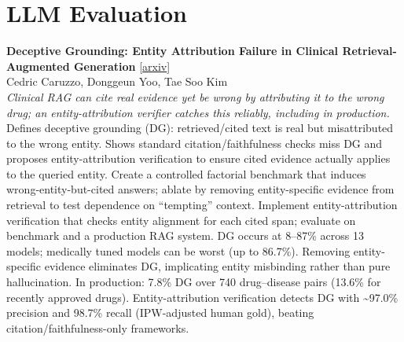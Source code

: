 \documentclass[12pt,letterpaper]{article}
\begin{document}
\medskip


\section*{LLM Evaluation}

{\small\textbf{Deceptive Grounding: Entity Attribution Failure in Clinical Retrieval-Augmented Generation}} {\scriptsize[\href{https://arxiv.org/abs/2607.09349}{arxiv}]}\\
{\scriptsize Cedric Caruzzo, Donggeun Yoo, Tae Soo Kim}\\

{\small\textit{Clinical RAG can cite real evidence yet be wrong by attributing it to the wrong drug; an entity-attribution verifier catches this reliably, including in production.}}\\[1pt]
{\footnotesize Defines deceptive grounding (DG): retrieved/cited text is real but misattributed to the wrong entity. Shows standard citation/faithfulness checks miss DG and proposes entity-attribution verification to ensure cited evidence actually applies to the queried entity. Create a controlled factorial benchmark that induces wrong-entity-but-cited answers; ablate by removing entity-specific evidence from retrieval to test dependence on ``tempting'' context. Implement entity-attribution verification that checks entity alignment for each cited span; evaluate on benchmark and a production RAG system. DG occurs at 8--87\% across 13 models; medically tuned models can be worst (up to 86.7\%). Removing entity-specific evidence eliminates DG, implicating entity misbinding rather than pure hallucination. In production: 7.8\% DG over 740 drug--disease pairs (13.6\% for recently approved drugs). Entity-attribution verification detects DG with \textasciitilde{}97.0\% precision and 98.7\% recall (IPW-adjusted human gold), beating citation/faithfulness-only frameworks.}

\medskip
\end{document}
